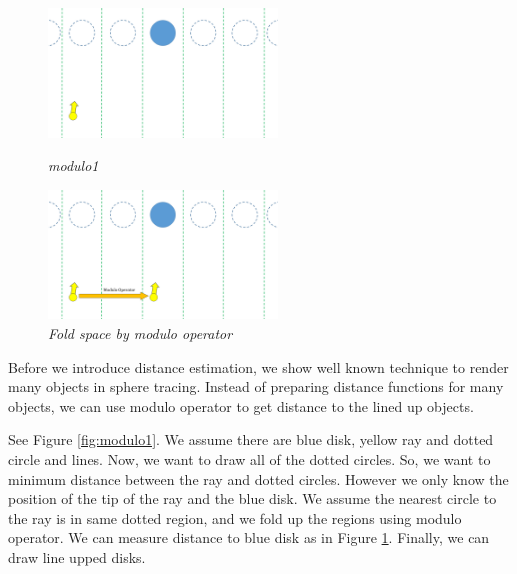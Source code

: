 \begin{figure}[htbp]
 \begin{minipage}[t]{0.5\hsize}
  \center
  \includegraphics[height=1.35in, keepaspectratio]{img/preparation/iis3d/modulo1.png}
  \caption{\textit{modulo1}}
  \label{fig:modulo1}
  \hspace*{\fill}
 \end{minipage}
 \begin{minipage}[t]{0.5\hsize}
  \center
  \includegraphics[height=1.35in, keepaspectratio]{img/preparation/iis3d/modulo2.png}
  \caption{\textit{Fold space by modulo operator}}
  \label{fig:modulo2}
  \hspace*{\fill}
 \end{minipage}
\end{figure}

Before we introduce distance estimation, we show
well known technique to render many objects in sphere tracing.
Instead of preparing distance functions for many objects, we can use modulo operator
to get distance to the lined up objects.

See Figure \ref{fig:modulo1}. We assume there are blue disk, yellow  ray and dotted
circle and lines.
Now, we want to draw all of the dotted circles.
So, we want to minimum distance between the ray and dotted circles.
However we only know the position of the tip of the ray and the blue disk.
We assume the nearest circle to the ray is in same dotted region, and
we fold up the regions using modulo operator.
We can measure distance to blue disk as in Figure \ref{fig:modulo2}.
Finally, we can draw line upped disks.

